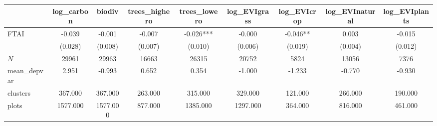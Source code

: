 {
\def\sym#1{\ifmmode^{#1}\else\(^{#1}\)\fi}
\begin{tabular}{l*{8}{c}}
\toprule
          &\multicolumn{1}{c}{log\_carbon}&\multicolumn{1}{c}{biodiv}&\multicolumn{1}{c}{trees\_highero}&\multicolumn{1}{c}{trees\_lowero}&\multicolumn{1}{c}{log\_EVIgrass}&\multicolumn{1}{c}{log\_EVIcrop}&\multicolumn{1}{c}{log\_EVInatural}&\multicolumn{1}{c}{log\_EVIplants}\\
\midrule
FTAI      &   -0.039   &   -0.001   &   -0.007   &   -0.026***&   -0.000   &   -0.046** &    0.003   &   -0.015   \\
          &  (0.028)   &  (0.008)   &  (0.007)   &  (0.010)   &  (0.006)   &  (0.019)   &  (0.004)   &  (0.012)   \\
\midrule
\(N\)     &    29961   &    29963   &    16663   &    26315   &    20752   &     5824   &    13056   &     7376   \\
mean\_depvar&    2.951   &   -0.993   &    0.652   &    0.354   &   -1.000   &   -1.233   &   -0.770   &   -0.930   \\
clusters  &  367.000   &  367.000   &  263.000   &  315.000   &  329.000   &  121.000   &  266.000   &  190.000   \\
plots     & 1577.000   & 1577.000   &  877.000   & 1385.000   & 1297.000   &  364.000   &  816.000   &  461.000   \\
\bottomrule
\end{tabular}
}
